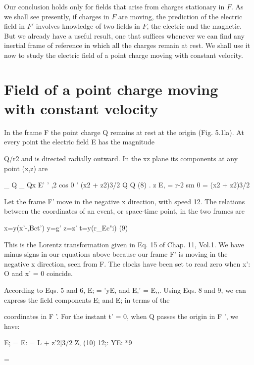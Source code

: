Our conclusion holds only for fields that arise from charges stationary
in $F$. As we shall see presently, if charges in $F$ are moving, the prediction
of the electric field in $F'$ involves knowledge of two fields in $F$,
the electric and the magnetic. But we already have a useful result,
one that suffices whenever we can find any inertial frame of reference
in which all the charges remain at rest. We shall use it now to study
the electric field of a point charge moving with constant velocity.

\iffalse

\section{Field of a point charge moving with constant velocity}
In the frame F the point charge Q remains at rest at the origin
(Fig. 5.1la). At every point the electric field E has the magnitude

 

Q/r2 and is directed radially outward. In the xz plane its components
at any point (x,z) are

\begin{equation}
\end{equation}
_ Q _ Qx
E' ' ,2 cos 0 ' (x2 + z2)3/2
Q Q (8)
. z
E, = r-2 sm 0 = (x2 + z2)3/2

Let the frame F' move in the negative x direction, with speed 12. The
relations between the coordinates of an event, or space-time point,
in the two frames are

\begin{equation}
\end{equation}
x=y(x'-,Bct') y=g' z=z' t=y(r_Ec"i) (9)

This is the Lorentz transformation given in Eq. 15 of Chap. 11, Vol.1.
We have minus signs in our equations above because our frame F' is
moving in the negative x direction, seen from F. The clocks have
been set to read zero when x': O and x' = 0 coincide.

According to Eqs. 5 and 6, E; = 'yE, and E,' = E,,. Using Eqs. 8
and 9, we can express the field components E; and E; in terms of the

coordinates in F '. For the instant t' = 0, when Q passes the origin
in F ', we have:

\begin{equation}
\end{equation}
E; = E: = L
 + z'2]3/2
Z, (10)
12;: YE: *9

= 

